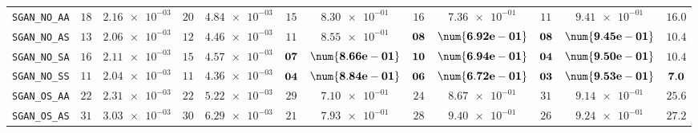 \begin{xltabular}{\textwidth}{l||cC|cC|cC|cC|cC||c}
	\texttt{SGAN\_NO\_AA} & $ 18$ & $ \num{2.16e-03}$ & $ 20$ & $ \num{4.84e-03}$ & $ 15$ & $ \num{8.30e-01}$ & $ 16$ & $ \num{7.36e-01}$ & $ 11$ & $ \num{9.41e-01}$ & $ 16.0$  \\
	\texttt{SGAN\_NO\_AS} & $ 13$ & $ \num{2.06e-03}$ & $ 12$ & $ \num{4.46e-03}$ & $ 11$ & $ \num{8.55e-01}$ & $\bf 08$ & $\bf \num{6.92e-01}$ & $\bf 08$ & $\bf \num{9.45e-01}$ & $ 10.4$  \\
	\texttt{SGAN\_NO\_SA} & $ 16$ & $ \num{2.11e-03}$ & $ 15$ & $ \num{4.57e-03}$ & $\bf 07$ & $\bf \num{8.66e-01}$ & $\bf 10$ & $\bf \num{6.94e-01}$ & $\bf 04$ & $\bf \num{9.50e-01}$ & $ 10.4$  \\
	\texttt{SGAN\_NO\_SS} & $ 11$ & $ \num{2.04e-03}$ & $ 11$ & $ \num{4.36e-03}$ & $\bf 04$ & $\bf \num{8.84e-01}$ & $\bf 06$ & $\bf \num{6.72e-01}$ & $\bf 03$ & $\bf \num{9.53e-01}$ & $\bf 7.0$  \\
	\texttt{SGAN\_OS\_AA} & $ 22$ & $ \num{2.31e-03}$ & $ 22$ & $ \num{5.22e-03}$ & $ 29$ & $ \num{7.10e-01}$ & $ 24$ & $ \num{8.67e-01}$ & $ 31$ & $ \num{9.14e-01}$ & $ 25.6$  \\
	\texttt{SGAN\_OS\_AS} & $ 31$ & $ \num{3.03e-03}$ & $ 30$ & $ \num{6.29e-03}$ & $ 21$ & $ \num{7.93e-01}$ & $ 28$ & $ \num{9.40e-01}$ & $ 26$ & $ \num{9.24e-01}$ & $ 27.2$  \\

\end{xltabular}
